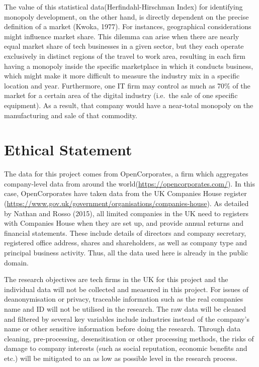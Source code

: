 \documentclass[
  12pt,
  oneside]{book}
\begin{document}
The value of this statistical data(Herfindahl-Hirschman Index) for identifying monopoly development, on the other hand, is directly dependent on the precise definition of a market (Kwoka, 1977). For instances, geographical considerations might influence market share. This dilemma can arise when there are nearly equal market share of tech businesses in a given sector, but they each operate exclusively in distinct regions of the travel to work area, resulting in each firm having a monopoly inside the specific marketplace in which it conducts business, which might make it more difficult to measure the industry mix in a specific location and year. Furthermore, one IT firm may control as much as 70\% of the market for a certain area of the digital industry (i.e.~the sale of one specific equipment). As a result, that company would have a near-total monopoly on the manufacturing and sale of that commodity.

\hypertarget{ethical-statement}{%
\section{Ethical Statement}\label{ethical-statement}}

The data for this project comes from OpenCorporates, a firm which aggregates company-level data from around the world(\url{https://opencorporates.com/}). In this case, OpenCorporates have taken data from the UK Companies House register (\url{https://www.gov.uk/government/organisations/companies-house}). As detailed by Nathan and Rosso (2015), all limited companies in the UK need to registers with Companies House when they are set up, and provide annual returns and financial statements. These include details of directors and company secretary, registered office address, shares and shareholders, as well as company type and principal business activity. Thus, all the data used here is already in the public domain.

The research objectives are tech firms in the UK for this project and the individual data will not be collected and measured in this project. For issues of deanonymisation or privacy, traceable information such as the real companies name and ID will not be utilised in the research. The raw data will be cleaned and filtered by several key variables include industries instead of the company's name or other sensitive information before doing the research. Through data cleaning, pre-processing, desensitisation or other processing methods, the risks of damage to company interests (such as social reputation, economic benefits and etc.) will be mitigated to an as low as possible level in the research process.
\end{document}
